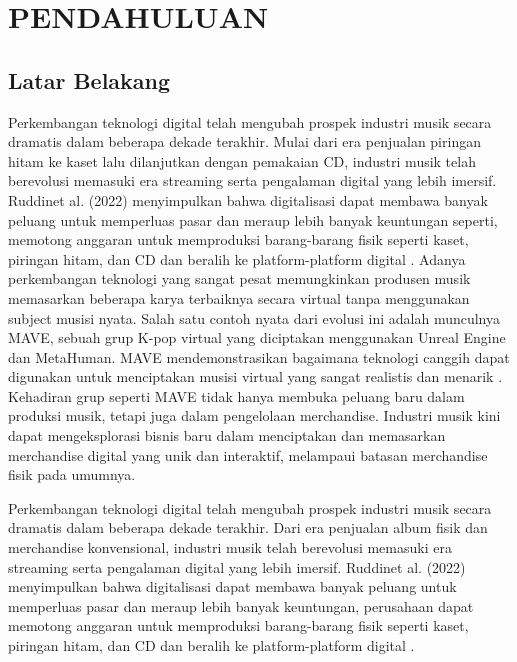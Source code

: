 \chapter{PENDAHULUAN}

\section{Latar Belakang}

Perkembangan teknologi digital telah mengubah prospek industri musik secara dramatis dalam beberapa dekade terakhir. 
Mulai dari era penjualan piringan hitam ke kaset lalu dilanjutkan dengan pemakaian CD, industri musik telah berevolusi 
memasuki era streaming serta pengalaman digital yang lebih imersif. Ruddinet al. (2022) menyimpulkan bahwa digitalisasi 
dapat membawa banyak peluang untuk memperluas pasar dan meraup lebih banyak keuntungan seperti, memotong anggaran untuk 
memproduksi barang-barang fisik seperti kaset, piringan hitam, dan CD dan beralih ke platform-platform digital \parencite{Ruddin2022}. Adanya
perkembangan teknologi yang sangat pesat memungkinkan produsen musik memasarkan beberapa karya terbaiknya secara virtual
tanpa menggunakan subject musisi nyata. Salah satu contoh nyata dari evolusi ini adalah munculnya MAVE, sebuah grup K-pop
virtual yang diciptakan menggunakan Unreal Engine dan MetaHuman. MAVE mendemonstrasikan bagaimana teknologi canggih dapat
digunakan untuk menciptakan musisi virtual yang sangat realistis dan menarik \parencite{EpicGames20213}. Kehadiran grup seperti MAVE tidak hanya
membuka peluang baru dalam produksi musik, tetapi juga dalam pengelolaan merchandise. Industri musik kini dapat 
mengeksplorasi bisnis baru dalam menciptakan dan memasarkan merchandise digital yang unik dan interaktif, melampaui 
batasan merchandise fisik pada umumnya.


Perkembangan teknologi digital telah mengubah prospek industri musik secara dramatis dalam beberapa dekade terakhir. 
Dari era penjualan album fisik dan merchandise konvensional, industri musik telah berevolusi memasuki era streaming 
serta pengalaman digital yang lebih imersif. Ruddinet al. (2022) menyimpulkan bahwa digitalisasi dapat membawa banyak
peluang untuk memperluas pasar dan meraup lebih banyak keuntungan, perusahaan dapat memotong anggaran untuk memproduksi
barang-barang fisik seperti kaset, piringan hitam, dan CD dan beralih ke platform-platform digital \parencite{Ruddin2022}.
\\

